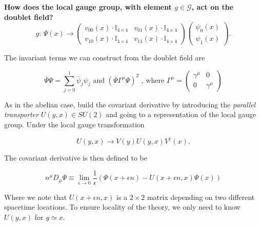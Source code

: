 \noindent \textbf{How does the local gauge group, with element $g \in \mathcal{G}$, act on the doublet field?} \\

\begin{equation}
g: \, \Psi (x) \rightarrow 
\left( \begin{array}{cc}
v_{00} (x) \cdot \mathbb{I}_{4 \times 4} & v_{01} (x) \cdot \mathbb{I}_{4 \times 4} \\
v_{10} (x) \cdot \mathbb{I}_{4 \times 4} & v_{11} (x) \cdot \mathbb{I}_{4 \times 4}
\end{array} \right)
\left( \begin{array}{c} \psi_0 (x) \\ \psi_1 (x) \end{array} \right).
\end{equation}

\noindent The invariant terms we can construct from the doublet field are 

\begin{equation}
\bar{\Psi} \Psi = \sum_{j=0}^1 \bar{\psi}_j \psi_j \text{ and } (\bar{\Psi} \Gamma^\mu \Psi)^2 \text{ , where } \Gamma^\mu = 
\left( \begin{array}{cc}
\gamma^\mu & 0 \\
0 & \gamma^\mu
\end{array} \right)
\end{equation}

\noindent As in the abelian case, build the covariant derivative by introducing the \textit{parallel transporter} $U(y,x) \in SU(2)$ and going to a representation of the local gauge group. Under the local gauge transformation

\begin{equation}
U(y,x) \rightarrow V(y) U(y,x) V^\dagger (x).
\end{equation}

\noindent The covariant derivative is then defined to be

\begin{equation}
n^\mu D_\mu \Psi \equiv \lim_{\epsilon \rightarrow 0} \frac{1}{\epsilon} (\Psi (x + \epsilon n) - U(x + \epsilon n, x) \Psi (x))
\end{equation}

\noindent Where we note that $U(x + \epsilon n, x)$ is a $2 \times 2$ matrix depending on two different spacetime locations. To ensure locality of the theory, we only need to know $U(y,x)$ for $y \simeq x$.\\

